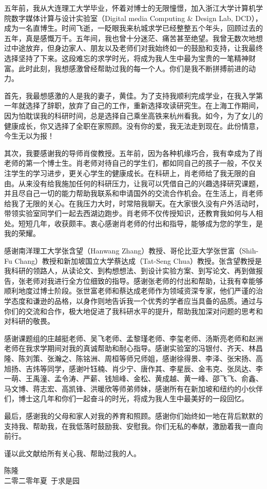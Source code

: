 \begin{thanks}

五年前，我从大连理工大学毕业，怀着对博士的无限憧憬，加入浙江大学计算机学院数字媒体计算与设计实验室（Digital media Computing \& Design Lab, DCD），成为一名直博生。时间飞逝，一眨眼我来杭城求学已经整整五个年头，回顾过去的五年，真是感慨万千。五年间，我也曾十分迷茫、痛苦甚至绝望。我曾无数次地想过中途放弃，但身边家人、朋友以及老师们对我始终如一的鼓励和支持，让我最终选择坚持了下来。这段难忘的求学时光，将成为我人生中最为宝贵的一笔精神财富。此时此刻，我想感激曾经帮助过我的每一个人。你们是我不断拼搏前进的动力。

首先，我最想感激的人是我的妻子，黄佳。为了支持我顺利完成学业，在我入学第一年就选择了辞职，放弃了自己的工作，重新选择攻读研究生。在上海工作期间，因为怕耽误我的科研时间，总是选择自己乘坐高铁来杭州看我。如今，为了女儿的健康成长，你又选择了全职在家照顾。没有你的爱，我无法走到现在。此份情意，今生无以为报！

其次，我要感谢我的导师肖俊教授。五年前，因为各种机缘巧合，我有幸成为了肖老师的第一个博士生。肖老师对待自己的学生们，都如同自己的孩子一般，不仅关注学生的学习进步，更关心学生的健康成长。在科研上，肖老师给了我无限的自由。从来没有给我施加任何的科研压力，让我可以凭借自己的兴趣选择研究课题，并且尽自己一切的能力帮助我联系和申请国外的交流合作机会。在生活上，肖老师给我了无限的关心。在我压力大时，时常陪我聊天。在大家很久没有户外活动时，带领实验室同学们一起去西湖边跑步。肖老师不仅传授知识，还教育我如何与人相处。短短几年，收获颇丰。衷心感谢肖老师的付出和指导，能够成为您的学生，是我的荣耀。

感谢南洋理工大学张含望（Hanwang Zhang）教授、哥伦比亚大学张世富（Shih-Fu Chang）教授和新加坡国立大学蔡达成（Tat-Seng Chua）教授。张含望教授是我科研的领路人，从读论文、到构想想法、到设计实验方案、到写论文、再到做报告，张老师对我进行全方位细致的指导。感谢张老师的付出和帮助，让我有幸能够顺利地度过博士阶段。张世富老师和蔡达成老师作为领域资深专家，他们严谨的治学态度和谦逊的品格，以身作则地告诉我一个优秀的学者应当具备的品质。通过与你们的交流和合作，极大地促进了我科研水平的提升，帮助我加深对问题的思考和对科研的敬畏。

感谢课题组的庄越挺老师、吴飞老师、孟黎瑾老师、李玺老师、汤斯亮老师和赵洲老师在我求学期间对我的真诚帮助和耐心指导。感谢实验室的冯银付、齐天、林昌隆、陈刘策、张瀚之、陈铭洲、周桓等师兄师姐，感谢徐得景、李泽、张宋扬、高旭扬、吉炜等同学，感谢叶钰楠、肖少宁、唐作其、李星辰、金韦克、张凤达、李一萌、王禹潼、孟令涛、严薪、钱旭峰、金松、黄成越、黄一峰、邵飞飞、俞鑫、马文博、蒋志宏、高凯锋、洪暖欣等师弟师妹，感谢所有在新加坡和纽约的小伙伴们，博士这几年和你们一起奋斗的时光，将成为我人生中最美好的一段回忆。

最后，感谢我的父母和家人对我的养育和照顾。感谢你们始终如一地在背后默默的支持我、帮助我，在我低落时鼓励我、安慰我。你们无私的奉献，激励着我一直向前行。

谨以此文献给所有关心我、帮助过我的人。

\begin{flushright}
	\begin{minipage}{12em}
	\begin{center}
		陈隆
		\\ 二零二零年夏\ 于求是园
	\end{center}
	\end{minipage}
\end{flushright}

\end{thanks}
